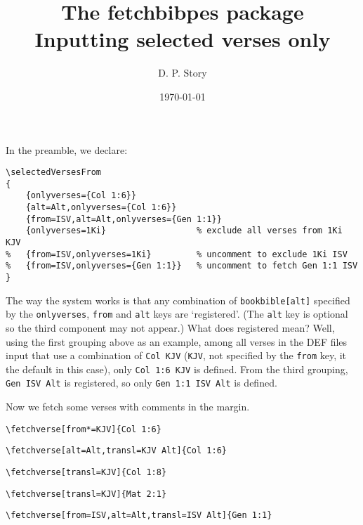 \documentclass{article}
\title{The \textsf{fetchbibpes} package\\[3pt]Inputting selected verses only}
\author{D. P. Story}
\date{\today}
\begin{document}
\maketitle

In the preamble, we declare:
\small
\begin{verbatim}
\selectedVersesFrom
{
    {onlyverses={Col 1:6}}
    {alt=Alt,onlyverses={Col 1:6}}
    {from=ISV,alt=Alt,onlyverses={Gen 1:1}}
    {onlyverses=1Ki}                  % exclude all verses from 1Ki KJV
%   {from=ISV,onlyverses=1Ki}         % uncomment to exclude 1Ki ISV
%   {from=ISV,onlyverses={Gen 1:1}}   % uncomment to fetch Gen 1:1 ISV
}
\end{verbatim}
\normalsize
The way the system works is that any combination of
\texttt{bookbible[alt]} specified by the
\texttt{onlyverses}, \texttt{from} and \texttt{alt} keys are
`registered'. (The \texttt{alt} key is optional so the third
component may not appear.) What does registered mean? Well, using the first
grouping above as an example, among all verses in the \textsf{DEF} files
input that use a combination of \texttt{Col KJV} (\texttt{KJV}, not specified
by the \texttt{from} key, it the default in this case), only \texttt{Col 1:6
KJV} is defined. From the third grouping, \texttt{Gen ISV Alt} is registered,
so only \texttt{Gen 1:1 ISV Alt} is defined.

Now we fetch some verses with comments in the margin.

\verb|\fetchverse[from*=KJV]{Col 1:6}|\\[3pt]

\verb|\fetchverse[alt=Alt,transl=KJV Alt]{Col 1:6}|\\[2pt]

\verb|\fetchverse[transl=KJV]{Col 1:8}|\\[3pt]

\bigskip
\verb|\fetchverse[transl=KJV]{Mat 2:1}|\\[3pt]

\verb|\fetchverse[from=ISV,alt=Alt,transl=ISV Alt]{Gen 1:1}|\\[3pt]
\end{document}
